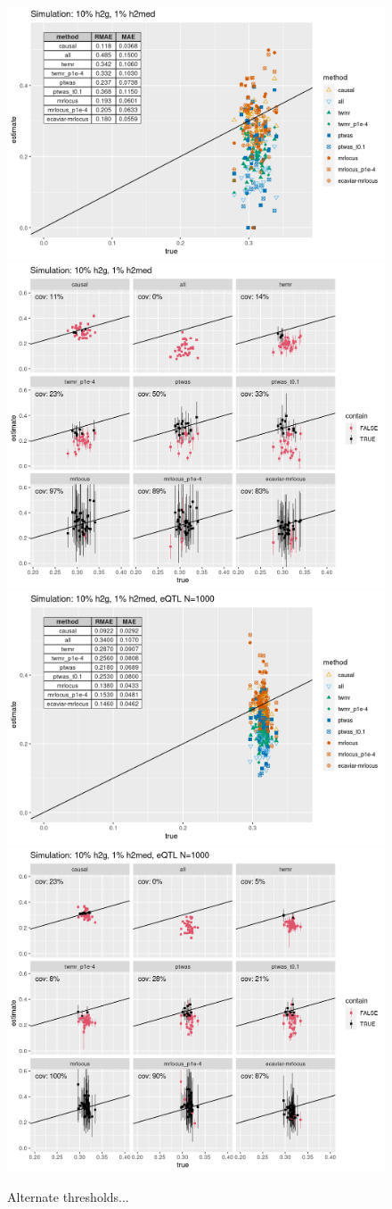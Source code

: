 \documentclass[11pt]{article}
\begin{document}
\begin{figure}[!ht]
  \centering
  \includegraphics[width=.52\textwidth]{figs/sim1extra.png}
  \includegraphics[width=.4\textwidth]{figs/cover1extra.png} \\
  \includegraphics[width=.52\textwidth]{figs/simhigh_nextra.png}
  \includegraphics[width=.4\textwidth]{figs/coverhigh_nextra.png}
  \caption{Alternate thresholds...}
\end{figure}
\end{document}
